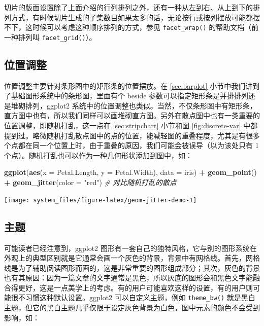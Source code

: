 \documentclass[
  b5paper,
  UTF8,twoside]{book}
\newenvironment{Shaded}{\begin{snugshade}}{\end{snugshade}}
\newcommand{\AttributeTok}[1]{\textcolor[rgb]{0.13,0.29,0.53}{#1}}
\newcommand{\CommentTok}[1]{\textcolor[rgb]{0.56,0.35,0.01}{\textit{#1}}}
\newcommand{\FunctionTok}[1]{\textcolor[rgb]{0.13,0.29,0.53}{\textbf{#1}}}
\newcommand{\NormalTok}[1]{#1}
\newcommand{\SpecialCharTok}[1]{\textcolor[rgb]{0.81,0.36,0.00}{\textbf{#1}}}
\newcommand{\StringTok}[1]{\textcolor[rgb]{0.31,0.60,0.02}{#1}}
\begin{document}
切片的版面设置除了上面介绍的行列排列之外，还有一种从左到右、从上到下的排列方式，有时候切片生成的子集数目如果太多的话，无论按行或按列摆放可能都摆不下，这时候可以考虑这种顺序排列的方式，参见 \texttt{facet\_wrap()} 的帮助文档（前一种排列叫 \texttt{facet\_grid()}）。

\subsection{位置调整}\label{ux4f4dux7f6eux8c03ux6574}

位置调整主要针对条形图中的矩形条的位置摆放。在 \ref{sec:barplot} 小节中我们讲到了基础图形系统中的条形图，里面有个 beside 参数可以指定矩形条是并排排列还是堆砌排列，ggplot2 系统中的位置调整也类似。当然，不仅条形图中有矩形条，直方图中也有，所以我们同样可以画堆砌直方图。另外在散点图中也有一类重要的位置调整，即随机打乱，这一点在 \ref{sec:stripchart} 小节和图 \ref{fig:discrete-var} 中都提到过。略微随机打乱散点图中的点的位置，能减轻图的重叠程度，尤其是有很多个点都在同一个位置上时，由于重叠的原因，我们可能会被误导（以为该处只有 1 个点）。随机打乱也可以作为一种几何形状添加到图中，如：

\begin{Shaded}
\begin{Highlighting}[]
\FunctionTok{ggplot}\NormalTok{(}\FunctionTok{aes}\NormalTok{(}\AttributeTok{x =}\NormalTok{ Petal.Length, }\AttributeTok{y =}\NormalTok{ Petal.Width), }\AttributeTok{data =}\NormalTok{ iris) }\SpecialCharTok{+}
  \FunctionTok{geom\_point}\NormalTok{() }\SpecialCharTok{+}
  \FunctionTok{geom\_jitter}\NormalTok{(}\AttributeTok{color =} \StringTok{"red"}\NormalTok{) }\CommentTok{\# 对比随机打乱的散点}
\end{Highlighting}
\end{Shaded}

\begin{center}\texttt{[image: system\_files/figure-latex/geom-jitter-demo-1]} \end{center}

\subsection{主题}\label{subsec:theme}

可能读者已经注意到，ggplot2 图形有一套自己的独特风格，它与别的图形系统在外观上的典型区别就是它通常会画一个灰色的背景，背景中有网格线。首先，网格线是为了辅助阅读图形而画的，这是非常重要的图形组成部分；其次，灰色的背景也有其原因：因为一篇文章的文字通常是黑色，所以灰底的图形会和黑色文字能融合得更好，这是一点美学上的考虑。有的用户可能喜欢这样的设置，有的用户则可能很不习惯这种默认设置。ggplot2 可以自定义主题，例如 \texttt{theme\_bw()} 就是黑白主题，但它的黑白主题几乎仅限于设定灰色背景为白色，图中元素的颜色不会受到影响，如：
\end{document}
